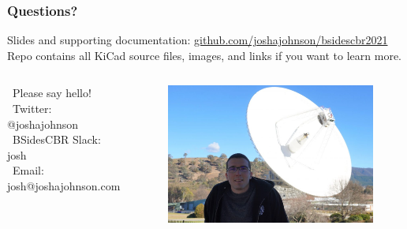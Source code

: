 \documentclass[aspectratio=169, t]{beamer}
\begin{document}
\begin{frame}
\frametitle{Questions?}
Slides and supporting documentation: \url{github.com/joshajohnson/bsidescbr2021}\\[10pt]
Repo contains all KiCad source files, images, and links if you want to learn more.\\[10pt]

\begin{columns}
	\ Please say hello!\\[10pt]
	\ Twitter: @\textunderscore joshajohnson\\
	\ BSidesCBR Slack: josh\\
	\ Email: josh@joshajohnson.com\\

	\vspace{-8mm}
	\begin{figure}
		\includegraphics[width=0.925\linewidth]{images/josh-mugshot.jpg}
	\end{figure}
\end{columns}
\end{frame}
\end{document}
